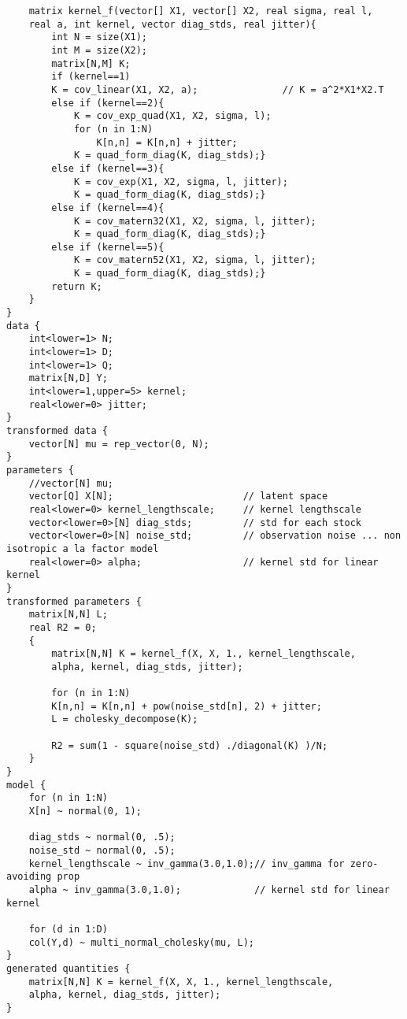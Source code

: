 \begin{lstlisting}
	matrix kernel_f(vector[] X1, vector[] X2, real sigma, real l, 
	real a, int kernel, vector diag_stds, real jitter){
		int N = size(X1);
		int M = size(X2);
		matrix[N,M] K;
		if (kernel==1)
		K = cov_linear(X1, X2, a);               // K = a^2*X1*X2.T
		else if (kernel==2){
			K = cov_exp_quad(X1, X2, sigma, l);
			for (n in 1:N)
				K[n,n] = K[n,n] + jitter;
			K = quad_form_diag(K, diag_stds);}
		else if (kernel==3){
			K = cov_exp(X1, X2, sigma, l, jitter);
			K = quad_form_diag(K, diag_stds);}
		else if (kernel==4){
			K = cov_matern32(X1, X2, sigma, l, jitter);
			K = quad_form_diag(K, diag_stds);}
		else if (kernel==5){
			K = cov_matern52(X1, X2, sigma, l, jitter);
			K = quad_form_diag(K, diag_stds);}
		return K;
	}
}
data {
	int<lower=1> N;
	int<lower=1> D;
	int<lower=1> Q;
	matrix[N,D] Y;
	int<lower=1,upper=5> kernel;
	real<lower=0> jitter;
}
transformed data {
	vector[N] mu = rep_vector(0, N);
}
parameters {
	//vector[N] mu;
	vector[Q] X[N];                       // latent space
	real<lower=0> kernel_lengthscale;     // kernel lengthscale
	vector<lower=0>[N] diag_stds;         // std for each stock
	vector<lower=0>[N] noise_std;         // observation noise ... non isotropic a la factor model
	real<lower=0> alpha;                  // kernel std for linear kernel
}
transformed parameters {
	matrix[N,N] L;
	real R2 = 0;
	{
		matrix[N,N] K = kernel_f(X, X, 1., kernel_lengthscale, 
		alpha, kernel, diag_stds, jitter);
		
		for (n in 1:N)
		K[n,n] = K[n,n] + pow(noise_std[n], 2) + jitter;
		L = cholesky_decompose(K);
		
		R2 = sum(1 - square(noise_std) ./diagonal(K) )/N;
	}
}
model {
	for (n in 1:N)
	X[n] ~ normal(0, 1);
	
	diag_stds ~ normal(0, .5);
	noise_std ~ normal(0, .5);
	kernel_lengthscale ~ inv_gamma(3.0,1.0);// inv_gamma for zero-avoiding prop
	alpha ~ inv_gamma(3.0,1.0);             // kernel std for linear kernel
	
	for (d in 1:D) 
	col(Y,d) ~ multi_normal_cholesky(mu, L);
}
generated quantities {
	matrix[N,N] K = kernel_f(X, X, 1., kernel_lengthscale, 
	alpha, kernel, diag_stds, jitter);
}
\end{lstlisting}
\cleardoubleoddpage

